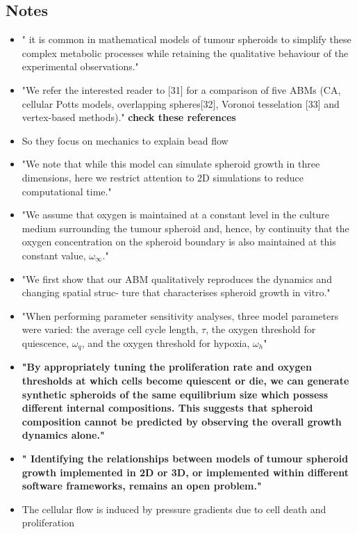 \documentclass[11pt,a4paper]{article}
\begin{document}
\subsection*{Notes}
\begin{itemize}
\item " it is common in mathematical models of tumour spheroids to simplify these complex metabolic processes while retaining the qualitative behaviour of the experimental observations."
\item "We refer the interested reader to [31] for a comparison of five ABMs (CA, cellular Potts models, overlapping spheres[32], Voronoi tesselation [33] and vertex-based methods)." \textbf{check these references}
\item So they focus on mechanics to explain bead flow
\item "We note that while this model can simulate spheroid growth in three dimensions, here we restrict
attention to 2D simulations to reduce computational time."
\item "We assume that oxygen is maintained at a constant level in the culture medium surrounding the tumour spheroid and, hence, by continuity that the oxygen concentration on the spheroid boundary is also maintained at this
constant value, $\omega_{\infty}$."
\item "We first show that our ABM qualitatively reproduces the dynamics and changing spatial struc-
ture that characterises spheroid growth in vitro."
\item "When performing parameter sensitivity analyses, three model parameters were varied: the average cell cycle
length, $\tau$, the oxygen threshold for quiescence, $\omega_{q}$, and the oxygen threshold for hypoxia, $\omega_{h}$"
\item \textbf{ "By appropriately tuning the proliferation rate and oxygen thresholds at which cells become quiescent or die, we can generate synthetic spheroids of the same equilibrium size which possess different internal compositions. This suggests that spheroid composition cannot be predicted by observing the overall growth dynamics alone."}
\item \textbf{" Identifying the relationships between models of tumour spheroid growth implemented in 2D or 3D, or implemented within different software frameworks, remains an open problem."}
\item The cellular flow is induced by pressure gradients due to cell death and proliferation
\end{itemize}
\end{document}
